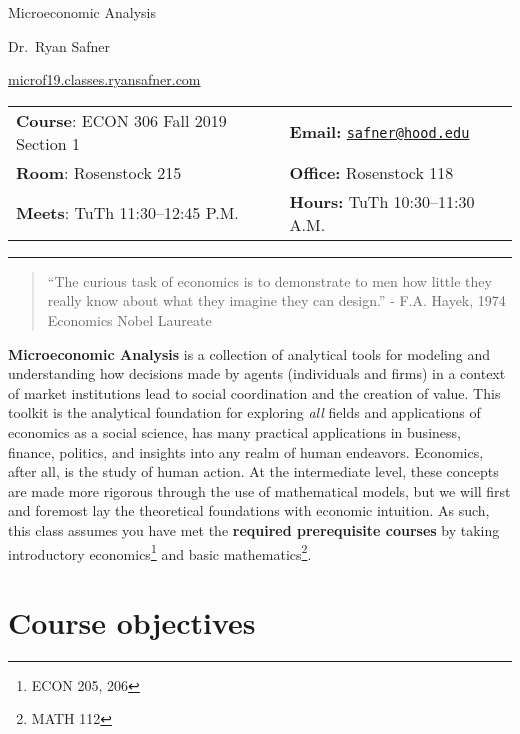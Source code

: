\documentclass{article}
\begin{document}
\sffamily

\centerline{\Huge Microeconomic Analysis}

\vspace{3 mm}

\centerline{\large Dr.~Ryan Safner}
\vspace{2 mm}
\centerline{\large \href{http://microf19.classes.ryansafner.com}{microf19.classes.ryansafner.com}}

\vspace{5 mm}

\begin{tabular}{@{}p{3.5in}p{3.5in}}           
\textbf{Course}: ECON 306 Fall 2019 Section 1 & \textbf{Email:}  \href{mailto:safner@hood.edu}{\nolinkurl{safner@hood.edu}}\\
\textbf{Room}: Rosenstock 215 & \textbf{Office:}  Rosenstock 118\\
\textbf{Meets}: TuTh 11:30--12:45 P.M. & \textbf{Hours:} TuTh 10:30--11:30 A.M.\\ 
\end{tabular}

\vspace{5 mm}

\hrule


\begin{quote}
``The curious task of economics is to demonstrate to men how little they
really know about what they imagine they can design.'' - F.A. Hayek,
1974 Economics Nobel Laureate
\end{quote}

\textbf{Microeconomic Analysis} is a collection of analytical tools for
modeling and understanding how decisions made by agents (individuals and
firms) in a context of market institutions lead to social coordination
and the creation of value. This toolkit is the analytical foundation for
exploring \emph{all} fields and applications of economics as a social
science, has many practical applications in business, finance, politics,
and insights into any realm of human endeavors. Economics, after all, is
the study of human action. At the intermediate level, these concepts are
made more rigorous through the use of mathematical models, but we will
first and foremost lay the theoretical foundations with economic
intuition. As such, this class assumes you have met the \textbf{required
prerequisite courses} by taking introductory economics\footnote{ECON
  205, 206} and basic mathematics\footnote{MATH 112}.

\hypertarget{course-objectives}{%
\section{Course objectives}\label{course-objectives}}
\end{document}
